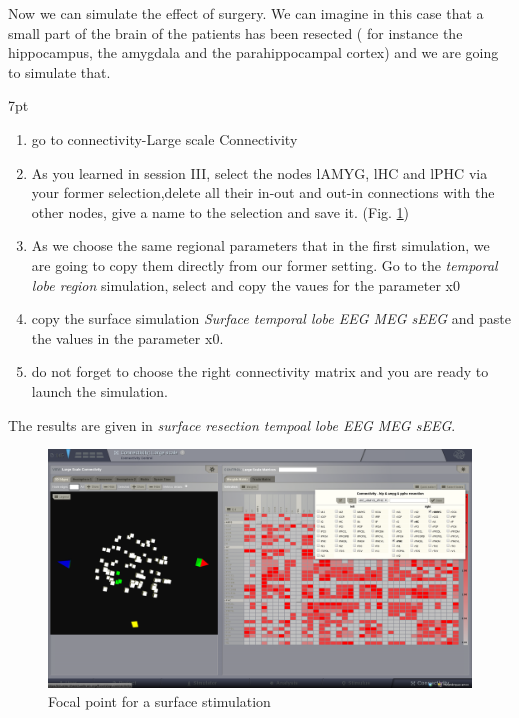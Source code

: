 \documentclass{tufte-handout}
\newenvironment{simulation}{%
  \def\FrameCommand{%
    \hspace{1pt}%
    {\color{ForestGreen}\vrule width 2pt}%
    {\color{simulationshade}\vrule width 4pt}%
    \colorbox{simulationshade}%
  }%
  \MakeFramed{\advance\hsize-\width\FrameRestore}%
  \noindent\hspace{-4.55pt}%
  \begin{adjustwidth}{}{7pt}%
  \vspace{2pt}\vspace{2pt}%
}
{%
  \vspace{2pt}\end{adjustwidth}\endMakeFramed%
}
\begin{document}
Now we can simulate the effect of surgery. We can imagine in this case that a small part of the brain of the patients 
has been resected ( for instance the hippocampus, the amygdala and the parahippocampal cortex) and 
we are going to simulate that.

\begin{simulation}
  \begin{enumerate}
  \item go to connectivity-Large scale Connectivity
  \item As you learned in session III, select the nodes lAMYG, lHC and lPHC via your former selection,delete all their in-out and out-in connections
  with the other nodes, give a name to the selection and save it. (Fig. \ref{fig:resec})
  \item As we choose the same regional parameters that in the first simulation, we are going to copy them directly from our
  former setting. Go to the \textit{temporal lobe region} simulation, select and copy the vaues for the parameter  x0 
  \item copy the surface simulation \textit{Surface temporal lobe EEG MEG sEEG} and paste the values in the parameter x0.
  \item do not forget to choose the right connectivity matrix and you are ready to launch the simulation.
  \end{enumerate}
\end{simulation}

The results are given in \textit{surface resection tempoal lobe EEG MEG sEEG}.

\begin{figure}[h]
  \includegraphics[width=\linewidth]{Handout_UI_ModellingAnEpilepticPatient_ConnectivityMatrixResection}%
  \caption{Focal point for a surface stimulation}%
  \label{fig:resec}%
\end{figure}
\end{document}
